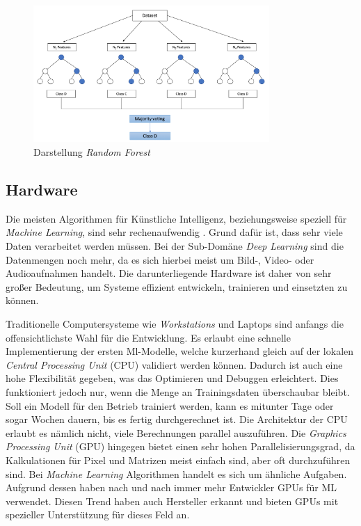 \begin{figure}[htbp]
	\centering
		\includegraphics[width=0.8\textwidth]{images/random_forest.png}
	\caption{Darstellung \textit{Random Forest}}
	\label{fig:random_forest}
\end{figure}

\subsection{Hardware}
\label{sec:ml_hardware}

Die meisten Algorithmen für Künstliche Intelligenz, beziehungsweise speziell für \textit{Machine Learning}, sind sehr rechenaufwendig \cite{Du2018}. Grund dafür ist, dass sehr viele Daten verarbeitet werden müssen. Bei der Sub-Domäne \textit{Deep Learning} sind die Datenmengen noch mehr, da es sich hierbei meist um Bild-, Video- oder Audioaufnahmen handelt. Die darunterliegende Hardware ist daher von sehr großer Bedeutung, um Systeme effizient entwickeln, trainieren und einsetzten zu können.

Traditionelle Computersysteme wie \textit{Workstations} und Laptops sind anfangs die offensichtlichste Wahl für die Entwicklung. Es erlaubt eine schnelle Implementierung der ersten Ml-Modelle, welche kurzerhand gleich auf der lokalen \textit{Central Processing Unit} (CPU) validiert werden können. Dadurch ist auch eine hohe Flexibilität gegeben, was das Optimieren und Debuggen erleichtert. Dies funktioniert jedoch nur, wenn die Menge an Trainingsdaten überschaubar bleibt. Soll ein Modell für den Betrieb trainiert werden, kann es mitunter Tage oder sogar Wochen dauern, bis es fertig durchgerechnet ist. Die Architektur der CPU erlaubt es nämlich nicht, viele Berechnungen parallel auszuführen. Die \textit{Graphics Processing Unit} (GPU) hingegen bietet einen sehr hohen Parallelisierungsgrad, da Kalkulationen für Pixel und Matrizen meist einfach sind, aber oft durchzuführen sind. Bei \textit{Machine Learning} Algorithmen handelt es sich um ähnliche Aufgaben. Aufgrund dessen haben nach und nach immer mehr Entwickler GPUs für ML verwendet. Diesen Trend haben auch Hersteller erkannt und bieten GPUs mit spezieller Unterstützung für dieses Feld an.

